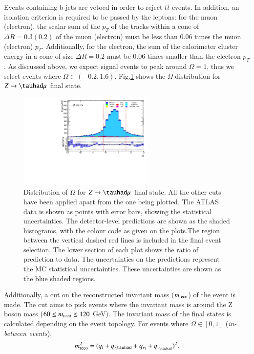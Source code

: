 Events containing b-jets are vetoed in order to reject $t\bar{t}$ events. In addition, an isolation criterion is required to be passed by the leptons: for the muon (electron), the scalar sum of the $p_T$ of the tracks within a cone of $\Delta R=0.3 (0.2)$ of the muon (electron) must be less than 0.06 times the muon (electron) $p_T$. Additionally, for the electron, the sum of the calorimeter cluster energy in a cone of size $\Delta R=0.2$ must be 0.06 times smaller than the electron $p_T$. As discussed above, we expect signal events to peak around $\Omega=1$, thus we select events where $\Omega\in (-0.2,1.6)$. Fig.\ref{Fig3} shows the $\Omega$ distribution for $Z\to\tauhad\mu$ final state.
\begin{figure}[htbp]
	\centering
	\includegraphics[width=0.6\textwidth]{figures/Fig3.pdf}
	\caption{Distribution of $\Omega$ for $Z\to\tauhad\mu$ final state. All the other cuts have been applied apart from the one being plotted. The ATLAS data is shown as points with error bars, showing the statistical uncertainties. The detector-level predictions are shown as the shaded histograms, with the colour code as given on the plots.The region between the vertical dashed red lines is included in the final event selection. The lower section of each plot shows the ratio of prediction to data. The uncertainties on the predictions represent the MC statistical uncertainties. These uncertainties are shown as the blue shaded regions.}
	\label{Fig3}
\end{figure}
Additionally, a cut on the reconstructed invariant mass ($m_{\text{reco}}$) of the event is made. The cut aims to pick events where the invariant mass is around the Z boson mass ($60\leq m_{\text{reco}}\leq 120$ GeV). The invariant mass of the final states is calculated depending on the event topology. For events where $\Omega\in [0,1]$ (\textit{in-between events}),
\begin{equation}
\mreco^{2}=(q_l+q_{\tauhad}+q_{\nu_l}+q_{\nu_{\tauhad}})^2.
\label{eq35a}
\end{equation}
